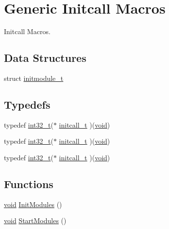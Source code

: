 \hypertarget{group___p_i_o_s___i_n_i_t_c_a_l_l}{\section{Generic Initcall Macros}
\label{group___p_i_o_s___i_n_i_t_c_a_l_l}
}


Initcall Macros.  


\subsection*{Data Structures}
\begin{DoxyCompactItemize}
\item 
struct \hyperlink{structinitmodule__t}{initmodule\-\_\-t}
\end{DoxyCompactItemize}
\subsection*{Typedefs}
\begin{DoxyCompactItemize}
\item 
typedef \hyperlink{group___n_a_m_e_gafd12020da5a235dfcf0c3c748fb5baed}{int32\-\_\-t}($\ast$ \hyperlink{group___p_i_o_s___i_n_i_t_c_a_l_l_ga4f58a033b271ad632c4583977de7e3c0}{initcall\-\_\-t} )(\hyperlink{group___n_a_m_e_ga18028b8badbf1ea7e704ccac3c488e82}{void})
\item 
typedef \hyperlink{group___n_a_m_e_gafd12020da5a235dfcf0c3c748fb5baed}{int32\-\_\-t}($\ast$ \hyperlink{group___p_i_o_s___i_n_i_t_c_a_l_l_ga4f58a033b271ad632c4583977de7e3c0}{initcall\-\_\-t} )(\hyperlink{group___n_a_m_e_ga18028b8badbf1ea7e704ccac3c488e82}{void})
\item 
typedef \hyperlink{group___n_a_m_e_gafd12020da5a235dfcf0c3c748fb5baed}{int32\-\_\-t}($\ast$ \hyperlink{group___p_i_o_s___i_n_i_t_c_a_l_l_ga4f58a033b271ad632c4583977de7e3c0}{initcall\-\_\-t} )(\hyperlink{group___n_a_m_e_ga18028b8badbf1ea7e704ccac3c488e82}{void})
\end{DoxyCompactItemize}
\subsection*{Functions}
\begin{DoxyCompactItemize}
\item 
\hyperlink{group___n_a_m_e_ga18028b8badbf1ea7e704ccac3c488e82}{void} \hyperlink{group___p_i_o_s___i_n_i_t_c_a_l_l_ga22e2a4c3789c279d63cfa8485ebd8bb0}{Init\-Modules} ()
\item 
\hyperlink{group___n_a_m_e_ga18028b8badbf1ea7e704ccac3c488e82}{void} \hyperlink{group___p_i_o_s___i_n_i_t_c_a_l_l_ga1fa873552e41faaf3affdeb7635de423}{Start\-Modules} ()
\end{DoxyCompactItemize}
